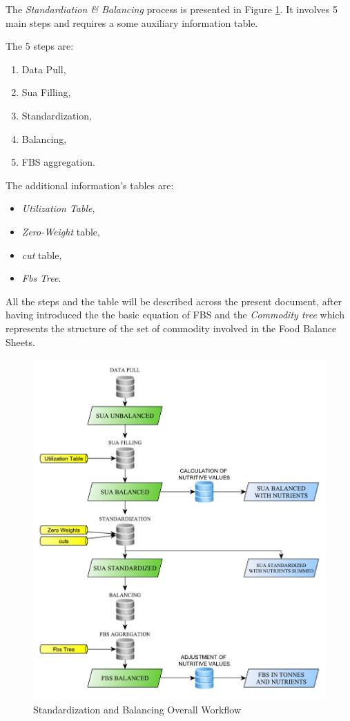 \documentclass[]{article}
\providecommand{\tightlist}{%
  \setlength{\itemsep}{0pt}\setlength{\parskip}{0pt}}
\begin{document}
The \emph{Standardiation \& Balancing} process is presented in Figure
\ref{fig:f9}. It involves 5 main steps and requires a some auxiliary
information table.

The 5 steps are:

\begin{enumerate}
\def\labelenumi{\arabic{enumi}.}
\tightlist
\item
  Data Pull,
\item
  Sua Filling,
\item
  Standardization,
\item
  Balancing,
\item
  FBS aggregation.
\end{enumerate}

The additional information's tables are:

\begin{itemize}
\tightlist
\item
  \emph{Utilization Table},
\item
  \emph{Zero-Weight} table,
\item
  \emph{cut} table,
\item
  \emph{Fbs Tree}.
\end{itemize}

All the steps and the table will be described across the present
document, after having introduced the the basic equation of FBS and the
\emph{Commodity tree} which represents the structure of the set of
commodity involved in the Food Balance Sheets.

\begin{figure}[H]

{\centering \includegraphics[width=0.8\linewidth]{images/09_overall} 

}

\caption{\label{fig:f9}Standardization and Balancing Overall Workflow}\label{fig:f9}
\end{figure}
\end{document}
